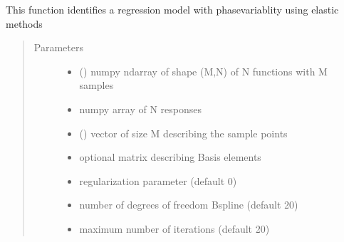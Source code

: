 \documentclass[letterpaper,10pt,english]{sphinxmanual}
\begin{document}

\begin{fulllineitems}
\label{\detokenize{regression:regression.elastic_regression}}
This function identifies a regression model with phase\sphinxhyphen{}variablity
using elastic methods
\begin{quote}\begin{description}
\item[{Parameters}] \leavevmode\begin{itemize}
\item {} 
 () \textendash{} numpy ndarray of shape (M,N) of N functions with M samples

\item {} 
 \textendash{} numpy array of N responses

\item {} 
 () \textendash{} vector of size M describing the sample points

\item {} 
 \textendash{} optional matrix describing Basis elements

\item {} 
 \textendash{} regularization parameter (default 0)

\item {} 
 \textendash{} number of degrees of freedom B\sphinxhyphen{}spline (default 20)

\item {} 
 \textendash{} maximum number of iterations (default 20)


\end{itemize}
\end{description}
\end{quote}
\end{fulllineitems}
\end{document}
